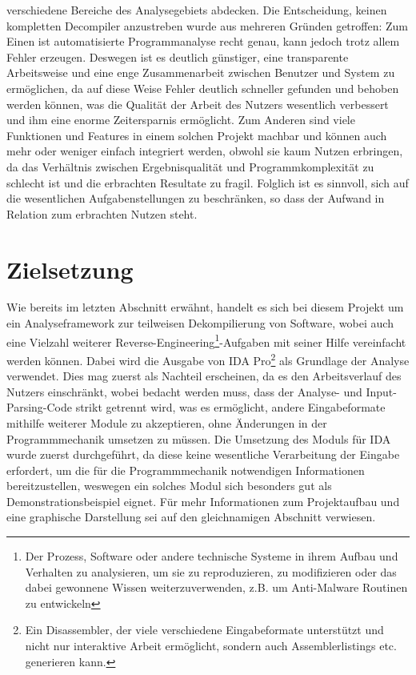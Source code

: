 \documentclass[11pt]{article} %
\begin{document}
verschiedene Bereiche des Analysegebiets abdecken. Die Entscheidung, keinen kompletten Decompiler
anzustreben wurde aus mehreren Gründen getroffen: Zum Einen ist automatisierte Programmanalyse recht
genau, kann jedoch trotz allem Fehler erzeugen. Deswegen ist es  deutlich günstiger, eine
transparente Arbeitsweise und eine enge Zusammenarbeit zwischen Benutzer und System zu ermöglichen,
da auf diese Weise Fehler deutlich schneller gefunden und behoben werden können, was die Qualität
der Arbeit des Nutzers wesentlich verbessert und ihm eine enorme Zeitersparnis ermöglicht. Zum Anderen sind
viele Funktionen und Features in einem solchen Projekt machbar und können auch mehr oder weniger
einfach integriert werden, obwohl sie kaum Nutzen erbringen, da das Verhältnis zwischen
Ergebnisqualität und Programmkomplexität zu schlecht ist und die erbrachten Resultate zu fragil.
Folglich ist es sinnvoll, sich auf die wesentlichen Aufgabenstellungen zu beschränken, so dass
der Aufwand in Relation zum erbrachten Nutzen steht.

\section{Zielsetzung} Wie bereits im letzten Abschnitt erwähnt, handelt es sich bei diesem Projekt
um ein Analyseframework zur teilweisen Dekompilierung von Software, wobei auch eine Vielzahl
weiterer Reverse-Engineering\footnote{Der Prozess, Software oder andere technische Systeme in ihrem
Aufbau und Verhalten zu analysieren, um sie zu reproduzieren, zu modifizieren oder das dabei
gewonnene Wissen weiterzuverwenden, z.B. um Anti-Malware Routinen zu entwickeln}-Aufgaben mit seiner
Hilfe vereinfacht werden können. Dabei wird die Ausgabe von IDA Pro\footnote{Ein Disassembler, der
viele verschiedene Eingabeformate unterstützt und nicht nur interaktive Arbeit ermöglicht, sondern
auch Assemblerlistings etc. generieren kann.} als Grundlage der Analyse verwendet. Dies mag zuerst
als Nachteil erscheinen, da es den Arbeitsverlauf des Nutzers einschränkt, wobei bedacht werden
muss, dass der Analyse- und Input-Parsing-Code strikt getrennt wird, was es ermöglicht, andere
Eingabeformate mithilfe weiterer Module zu akzeptieren, ohne Änderungen in der Programmmechanik
umsetzen zu müssen. Die Umsetzung des Moduls für IDA wurde zuerst durchgeführt, da diese keine
wesentliche Verarbeitung der Eingabe erfordert, um die für die Programmmechanik notwendigen
Informationen bereitzustellen, weswegen ein solches Modul sich besonders gut als
Demonstrationsbeispiel eignet. Für mehr Informationen zum Projektaufbau und eine graphische
Darstellung sei auf den gleichnamigen Abschnitt verwiesen.
\end{document}
